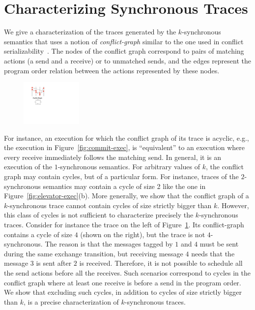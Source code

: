 \section{Characterizing Synchronous Traces}\label{sec:characterizations}

We give a characterization of the traces generated by the $k$-synchronous semantics that uses a notion of \emph{conflict-graph} similar to the one used in conflict serializability~\cite{journals/jacm/Papadimitriou79b}. The nodes of the conflict graph correspond to pairs of matching actions (a send and a receive) or to unmatched sends, and the edges represent the program order relation between the actions represented by these nodes. 
\begin{figure}
\vspace{-5mm}
\includegraphics[width=3cm]{ex-rs-cycle.pdf}
\caption{ }
\label{fig:ex-rs-cycle}
\vspace{-8mm}
\end{figure}
For instance, an execution for which the conflict graph of its trace is acyclic, e.g., the execution in Figure~\ref{fig:commit-exec}, is ``equivalent'' to an execution where every receive immediately follows the matching send. 
In general, it is an execution of the $1$-synchronous semantics. For arbitrary values of $k$, the conflict graph may contain cycles, but of a particular form. For instance, traces of the $2$-synchronous semantics may contain a cycle of size 2 like the one in Figure~\ref{fig:elevator-exec}(b). More generally, we show that the conflict graph of a $k$-synchronous trace cannot contain cycles of size strictly bigger than $k$. However, this class of cycles is not sufficient to characterize precisely the $k$-synchronous traces. Consider for instance the trace on the left of Figure~\ref{fig:ex-rs-cycle}. Its conflict-graph contains a cycle of size $4$ (shown on the right), but the trace is not $4$-synchronous. The reason is that the messages tagged by $1$ and $4$ must be sent during the same exchange transition, but receiving message $4$ needs that the message $3$ is sent after $2$ is received. Therefore, it is not possible to schedule all the send actions before all the receives. Such scenarios correspond to cycles in the conflict graph where at least one receive is before a send in the program order. We show that excluding such cycles, in addition to cycles of size strictly bigger than $k$, is a precise characterization of $k$-synchronous traces.



